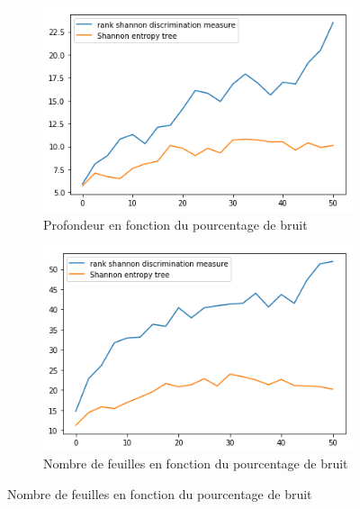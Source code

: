 \documentclass[a4paper]{article}
\begin{document}
\begin{figure}[H]
    \begin{subfigure}[c]{0.46\textwidth}
        \centering
        \includegraphics[width=\textwidth]{images/depth_3.png}
        \caption{Profondeur en fonction du pourcentage de bruit}
    \end{subfigure}
    \begin{subfigure}[c]{0.46\textwidth}
        \centering
        \includegraphics[width=\textwidth]{images/leaves_3.png}
        \caption{Nombre de feuilles en fonction du pourcentage de bruit}
    \end{subfigure}


\end{figure}
\end{document}
